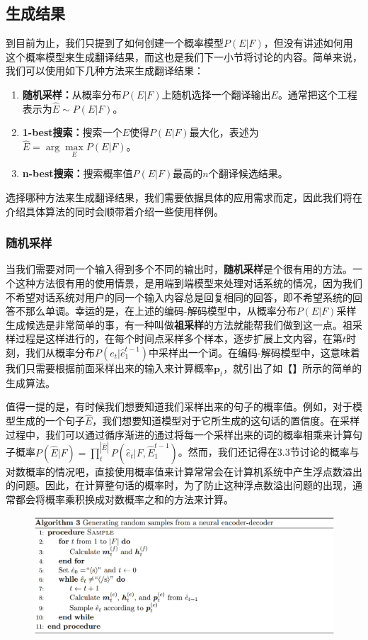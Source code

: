 \documentclass[10pt,a4paper]{ctexart}
\begin{document}
\subsection{生成结果}
到目前为止，我们只提到了如何创建一个概率模型$P(E|F)$，但没有讲述如何用这个概率模型来生成翻译结果，而这也是我们下一小节将讨论的内容。简单来说，我们可以使用如下几种方法来生成翻译结果：
\begin{enumerate}
\item[] \textbf{随机采样：}从概率分布$P(E|F)$上随机选择一个翻译输出$E$。通常把这个工程表示为$\hat{E} \sim P(E|F)$。
\item[] \textbf{1-best搜索：}搜索一个$E$使得$P(E|F)$最大化，表述为$\hat{E} = \arg\max \limits_{E} P(E|F)$。
\item[] \textbf{n-best搜索：}搜索概率值$P(E|F)$最高的$n$个翻译候选结果。
\end{enumerate}
选择哪种方法来生成翻译结果，我们需要依据具体的应用需求而定，因此我们将在介绍具体算法的同时会顺带着介绍一些使用样例。

\subsubsection{随机采样}
当我们需要对同一个输入得到多个不同的输出时，\textbf{随机采样}是个很有用的方法。一个这种方法很有用的使用情景，是用端到端模型来处理对话系统的情况，因为我们不希望对话系统对用户的同一个输入内容总是回复相同的回答，即不希望系统的回答不那么单调。幸运的是，在上述的编码-解码模型中，从概率分布$P(E|F)$采样生成候选是非常简单的事，有一种叫做\textbf{祖采样}的方法就能帮我们做到这一点。祖采样过程是这样进行的，在每个时间点采样多个样本，逐步扩展上文内容，在第$t$时刻，我们从概率分布$P(e_t | \hat{e}_1^{t-1})$中采样出一个词。在编码-解码模型中，这意味着我们只需要根据前面采样出来的输入来计算概率$\textbf{p}_t$，就引出了如【】所示的简单的生成算法。

值得一提的是，有时候我们想要知道我们采样出来的句子的概率值。例如，对于模型生成的一个句子$\hat{E}$，我们想要知道模型对于它所生成的这句话的置信度。在采样过程中，我们可以通过循序渐进的通过将每一个采样出来的词的概率相乘来计算句子概率$P(\hat{E}|F) = \prod_{t}^{|\hat{E}|}P(\hat{e}_t|F,\hat{E}_1^{t-1})$。然而，我们还记得在3.3节讨论的概率与对数概率的情况吧，直接使用概率值来计算常常会在计算机系统中产生浮点数溢出的问题。因此，在计算整句话的概率时，为了防止这种浮点数溢出问题的出现，通常都会将概率乘积换成对数概率之和的方法来计算。

\begin{figure}[H]
\centering
\includegraphics[width=1\textwidth]{alg3.png}
\end{figure}
\end{document}
